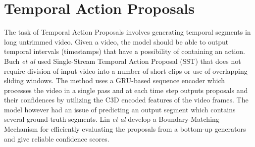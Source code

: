 \section{Temporal Action Proposals}
\par The task of Temporal Action Proposals involves generating temporal segments in long untrimmed video. Given a video, the model should be able to output temporal intervals (timestamps) that have a possibility of containing an action. Buch \textit{et al} \cite{SST} used Single-Stream Temporal Action Proposal (SST) that does not require division of input video into a number of short clips or use of overlapping sliding windows. The method uses a GRU-based sequence encoder which processes the video in a single pass and at each time step outputs proposals and their confidences by utilizing the C3D encoded features of the video frames. The model however had an issue of predicting an output segment which contains several ground-truth segments. Lin \textit{et al} \cite{BMN} develop a Boundary-Matching Mechanism for efficiently evaluating the proposals from a bottom-up generators and give reliable confidence scores.

